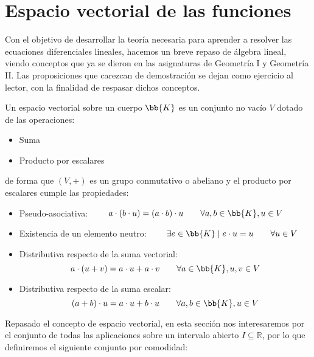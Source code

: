 \section{Espacio vectorial de las funciones}
Con el objetivo de desarrollar la teoría necesaria para aprender a resolver las ecuaciones diferenciales lineales, hacemos un breve repaso de álgebra lineal, viendo conceptos que ya se dieron en las asignaturas de Geometría I y Geometría II\@. Las proposiciones que carezcan de demostración se dejan como ejercicio al lector, con la finalidad de respasar dichos conceptos.

\begin{definicion}
    Un espacio vectorial sobre un cuerpo $\bb{K}$ es un conjunto no vacío $V$ dotado de las operaciones:
    \begin{itemize}
        \item Suma 
        \item Producto por escalares
    \end{itemize}
    de forma que $(V,+)$ es un grupo conmutativo o abeliano y el producto por escalares cumple las propiedades:
    \begin{itemize}
        \item Pseudo-asociativa: $\qquad a\cdot (b\cdot u) = (a\cdot b)\cdot u \qquad \forall a,b\in \bb{K}, u\in V$
        \item Existencia de un elemento neutro: $\qquad \exists e\in \bb{K} \mid e\cdot u = u \qquad \forall u\in V$
        \item Distributiva respecto de la suma vectorial:
            \begin{equation*}
                a\cdot (u+v) = a\cdot u + a\cdot v \qquad \forall a\in \bb{K}, u,v\in V
            \end{equation*}
        \item Distributiva respecto de la suma escalar:
            \begin{equation*}
                (a+b)\cdot u = a\cdot u + b\cdot u \qquad \forall a,b\in \bb{K}, u\in V
            \end{equation*} 
    \end{itemize}
\end{definicion}

Repasado el concepto de espacio vectorial, en esta sección nos interesaremos por el conjunto de todas las aplicaciones sobre un intervalo abierto $I\subseteq \mathbb{R}$, por lo que definiremos el siguiente conjunto por comodidad:


